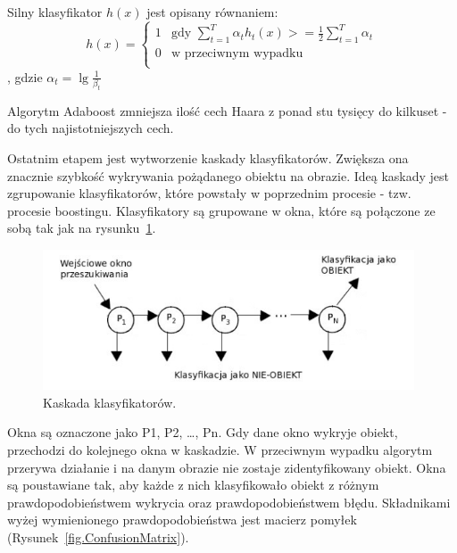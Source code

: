 \documentclass[a4paper,twoside,12pt]{book}
\begin{document}
    Silny klasyfikator $h(x)$ jest opisany równaniem:
    \large
    \begin{equation}
        h(x) = \left\{ \begin{array}{ll}
                           1 & \textrm{gdy $\sum_{t=1}^{T}\alpha_{t}h_{t}(x) >= \frac{1}{2} \sum_{t=1}^{T}\alpha_{t}$}\\
                           0 & \textrm{w przeciwnym wypadku}\\
        \end{array} \right.
        \label{wzor.adaboost4}
    \end{equation}
    \normalsize
    , gdzie $\alpha_{t} = \lg \frac{1}{\beta_{t}}$

    Algorytm Adaboost zmniejsza ilość cech Haara z ponad stu tysięcy do kilkuset - do tych najistotniejszych cech.

    Ostatnim etapem jest wytworzenie kaskady klasyfikatorów.
    Zwiększa ona znacznie szybkość wykrywania pożądanego obiektu na obrazie.
    Ideą kaskady jest zgrupowanie klasyfikatorów,
    które powstały w poprzednim procesie - tzw. procesie boostingu.
    Klasyfikatory są grupowane w okna,
    które są połączone ze sobą tak jak na rysunku~\ref{fig.kaskadaHaar}.
    \begin{figure}
        \centering
        \includegraphics[width=11cm]{Obrazy/kaskadaHaar.jpg}
        \caption{Kaskada klasyfikatorów.~\cite{kaskadaHaarObraz}}
        \label{fig.kaskadaHaar}
    \end{figure}
    Okna są oznaczone jako P1, P2, \ldots, Pn.
    Gdy dane okno wykryje obiekt, przechodzi do kolejnego okna w kaskadzie.
    W przeciwnym wypadku algorytm przerywa działanie i na danym obrazie nie zostaje zidentyfikowany obiekt.
    Okna są poustawiane tak, aby każde z nich klasyfikowało obiekt z różnym prawdopodobieństwem wykrycia oraz
    prawdopodobieństwem błędu.
    Składnikami wyżej wymienionego prawdopodobieństwa jest macierz pomyłek (Rysunek~\ref{fig.ConfusionMatrix}).
\end{document}
